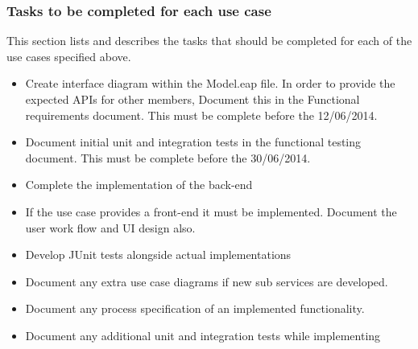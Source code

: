 \documentclass[12pt]{article}
\begin{document}
\subsubsection{Tasks to be completed for each use case}
This section lists and describes the tasks that should be completed for each of the use cases specified above.
\begin{itemize}
	\item Create interface diagram within the Model.eap file. In order to provide the expected APIs for other members, Document this in the Functional requirements document. This must be complete before the 12/06/2014.
	\item Document initial unit and integration tests in the functional testing document. This must be complete before the 30/06/2014.
	\item Complete the implementation of the back-end
	\item If the use case provides a front-end it must be implemented. Document the user work flow and UI design also.
	\item Develop JUnit tests alongside actual implementations 
	\item Document any extra use case diagrams if new sub services are developed.
	\item Document any process specification of an implemented functionality. 
	\item Document any additional unit and integration tests while implementing
\end{itemize}
\end{document}
